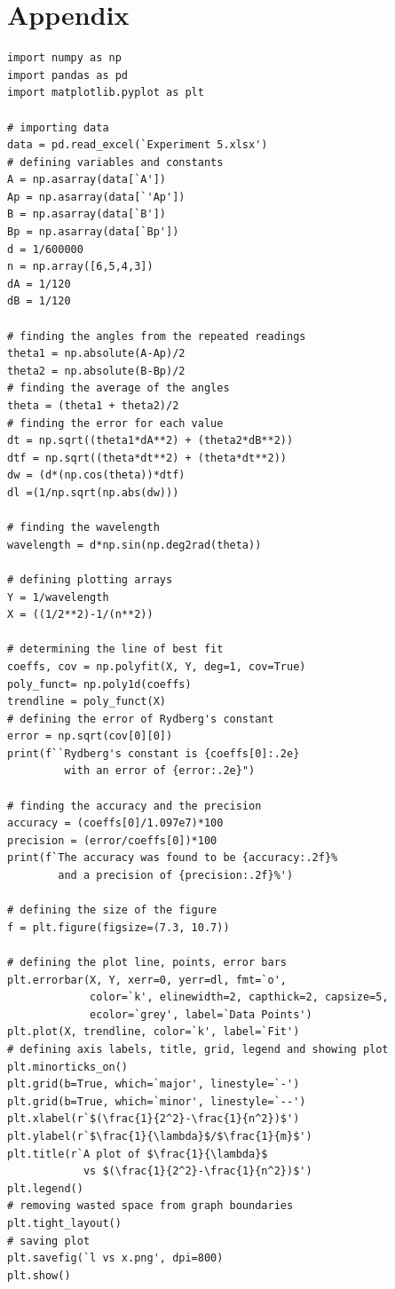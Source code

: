 \documentclass[12pt, a4paper]{article}
\begin{document}
\section*{Appendix}
\lstset{language=Python,
    showstringspaces=false,
    showtabs=false}
\begin{lstlisting}
import numpy as np
import pandas as pd
import matplotlib.pyplot as plt

# importing data
data = pd.read_excel(`Experiment 5.xlsx')
# defining variables and constants
A = np.asarray(data[`A'])
Ap = np.asarray(data[`'Ap'])
B = np.asarray(data[`B'])
Bp = np.asarray(data[`Bp'])
d = 1/600000
n = np.array([6,5,4,3])
dA = 1/120
dB = 1/120

# finding the angles from the repeated readings
theta1 = np.absolute(A-Ap)/2
theta2 = np.absolute(B-Bp)/2
# finding the average of the angles
theta = (theta1 + theta2)/2
# finding the error for each value
dt = np.sqrt((theta1*dA**2) + (theta2*dB**2))
dtf = np.sqrt((theta*dt**2) + (theta*dt**2))
dw = (d*(np.cos(theta))*dtf)
dl =(1/np.sqrt(np.abs(dw)))

# finding the wavelength
wavelength = d*np.sin(np.deg2rad(theta))

# defining plotting arrays
Y = 1/wavelength
X = ((1/2**2)-1/(n**2))

# determining the line of best fit
coeffs, cov = np.polyfit(X, Y, deg=1, cov=True)
poly_funct= np.poly1d(coeffs)
trendline = poly_funct(X)
# defining the error of Rydberg's constant
error = np.sqrt(cov[0][0])
print(f``Rydberg's constant is {coeffs[0]:.2e}
         with an error of {error:.2e}")

# finding the accuracy and the precision
accuracy = (coeffs[0]/1.097e7)*100
precision = (error/coeffs[0])*100
print(f`The accuracy was found to be {accuracy:.2f}%
        and a precision of {precision:.2f}%')

# defining the size of the figure
f = plt.figure(figsize=(7.3, 10.7))

# defining the plot line, points, error bars
plt.errorbar(X, Y, xerr=0, yerr=dl, fmt=`o', 
             color=`k', elinewidth=2, capthick=2, capsize=5,
             ecolor=`grey', label=`Data Points')
plt.plot(X, trendline, color=`k', label=`Fit')
# defining axis labels, title, grid, legend and showing plot
plt.minorticks_on()
plt.grid(b=True, which=`major', linestyle=`-')
plt.grid(b=True, which=`minor', linestyle=`--')
plt.xlabel(r`$(\frac{1}{2^2}-\frac{1}{n^2})$')
plt.ylabel(r`$\frac{1}{\lambda}$/$\frac{1}{m}$')
plt.title(r`A plot of $\frac{1}{\lambda}$ 
            vs $(\frac{1}{2^2}-\frac{1}{n^2})$')
plt.legend()
# removing wasted space from graph boundaries
plt.tight_layout()
# saving plot
plt.savefig(`l vs x.png', dpi=800)
plt.show()
\end{lstlisting}
\end{document}
